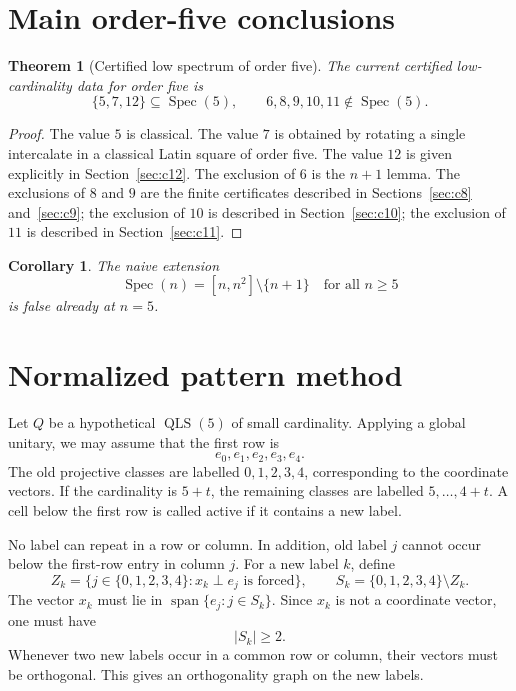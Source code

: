 \documentclass[11pt]{article}
\newtheorem{theorem}{Theorem}
\newtheorem{corollary}{Corollary}
\newcommand{\Spec}{\operatorname{Spec}}
\newcommand{\QLS}{\operatorname{QLS}}
\newcommand{\Span}{\operatorname{span}}
\begin{document}
\section{Main order-five conclusions}

\begin{theorem}[Certified low spectrum of order five]
The current certified low-cardinality data for order five is
\[
  \{5,7,12\}\subseteq \Spec(5),\qquad
  6,8,9,10,11\notin \Spec(5).
\]
\end{theorem}

\begin{proof}
The value \(5\) is classical.  The value \(7\) is obtained by rotating a
single intercalate in a classical Latin square of order five.  The value
\(12\) is given explicitly in Section~\ref{sec:c12}.  The exclusion of \(6\)
is the \(n+1\) lemma.  The exclusions of \(8\) and \(9\) are the finite
certificates described in Sections~\ref{sec:c8} and~\ref{sec:c9}; the
exclusion of \(10\) is described in Section~\ref{sec:c10}; the exclusion of
\(11\) is described in Section~\ref{sec:c11}.
\end{proof}

\begin{corollary}
The naive extension
\[
  \Spec(n)=[n,n^2]\setminus\{n+1\}\quad\text{for all }n\ge 5
\]
is false already at \(n=5\).
\end{corollary}

\section{Normalized pattern method}

Let \(Q\) be a hypothetical \(\QLS(5)\) of small cardinality.  Applying a
global unitary, we may assume that the first row is
\[
  e_0,e_1,e_2,e_3,e_4.
\]
The old projective classes are labelled \(0,1,2,3,4\), corresponding to the
coordinate vectors.  If the cardinality is \(5+t\), the remaining classes are
labelled \(5,\ldots,4+t\).  A cell below the first row is called active if it
contains a new label.

No label can repeat in a row or column.  In addition, old label \(j\) cannot
occur below the first-row entry in column \(j\).  For a new label \(k\), define
\[
  Z_k=\{j\in\{0,1,2,3,4\}: x_k\perp e_j \text{ is forced}\},\qquad
  S_k=\{0,1,2,3,4\}\setminus Z_k.
\]
The vector \(x_k\) must lie in \(\Span\{e_j:j\in S_k\}\).  Since \(x_k\) is
not a coordinate vector, one must have
\[
  |S_k|\ge 2.
\]
Whenever two new labels occur in a common row or column, their vectors must be
orthogonal.  This gives an orthogonality graph on the new labels.
\end{document}
